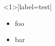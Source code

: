 \documentclass{beamer}
\begin{document}
\begin{frame}<1>[label=test]
    \begin{itemize}[<+>]
    \item foo
    \item bar
    \end{itemize}
\end{frame}

\end{document}
